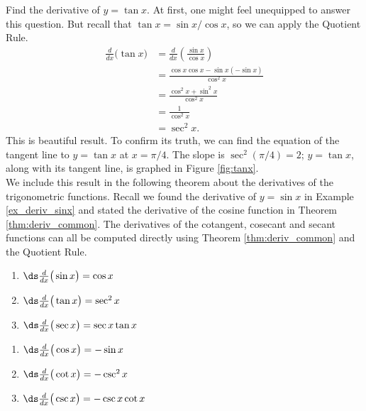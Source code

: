 {Find the derivative of $y=\tan x$.}
{At first, one might feel unequipped to answer this question. But recall that $\tan x = \sin x/\cos x$, so we can apply the Quotient Rule.
		\begin{align*}
		\frac{d}{dx}\Big(\tan x\Big) &= \frac{d}{dx}\left(\frac{\sin x}{\cos x}\right) \\
																	&=	\frac{\cos x \cos x - \sin x (-\sin x)}{\cos^2 x} \\
																	&= \frac{\cos^2x+\sin^2x}{\cos^2x}\\
																	&= \frac{1}{\cos^2x} \\
																	&= \sec ^2 x.
		\end{align*}
This is beautiful result. To confirm its truth, we can find the equation of the tangent line to $y=\tan x$ at $x=\pi/4$. The slope is $\sec^2(\pi/4) = 2$; $y=\tan x$, along with its tangent line, is graphed in Figure \ref{fig:tanx}.
}\\

We include this result in the following theorem about the derivatives of the trigonometric functions. Recall we found the derivative of $y=\sin x$ in Example \ref{ex_deriv_sinx} and stated the derivative of the cosine function in Theorem \ref{thm:deriv_common}. The derivatives of the cotangent, cosecant and secant functions can all be computed directly using Theorem \ref{thm:deriv_common} and the Quotient Rule.

{		\noindent\begin{minipage}[t]{.5\specialboxlength}
		\begin{enumerate}
		\item		$\ds \frac{d}{dx}\big(\sin x\big) = \cos x$\addtocounter{enumi}{1}
		\item		$\ds \frac{d}{dx}\big(\tan x\big) = \sec^2 x$\addtocounter{enumi}{1}
		\item		$\ds \frac{d}{dx}\big(\sec x\big) = \sec x\tan x$\addtocounter{enumi}{1}
		\end{enumerate}
		\end{minipage}
		\noindent\begin{minipage}[t]{.5\specialboxlength}
		\begin{enumerate}\addtocounter{enumi}{1}
		\item		$\ds \frac{d}{dx}\big(\cos x\big) = -\sin x$\addtocounter{enumi}{1}
		\item		$\ds \frac{d}{dx}\big(\cot x\big) = -\csc^2 x$\addtocounter{enumi}{1}
		\item		$\ds \frac{d}{dx}\big(\csc x\big) = -\csc x\cot x$
		\end{enumerate}
		\end{minipage}
}

